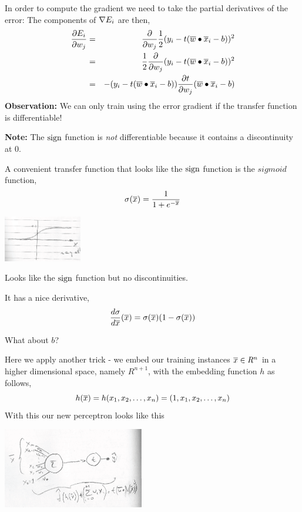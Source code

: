 \documentclass[a4paper,blends,pdf,colorBG,slideColor]{prosper}
\begin{document}
In order to compute the gradient we need to take the partial derivatives of the error:  The components of $\nabla E_i$ are then,
\begin{eqnarray*}
\frac{\partial E_i}{\partial w_j} &=& \frac{\partial}{\partial w_j} \frac{1}{2} (y_i - t(\overline{w}\bullet\overline{x}_i - b))^2\\
	&=& \frac{1}{2} \frac{\partial}{\partial w_j} (y_i - t(\overline{w}\bullet\overline{x}_i - b))^2\\
	&=& - (y_i - t(\overline{w}\bullet\overline{x}_i - b))\frac{\partial t}{\partial w_j} (\overline{w}\bullet\overline{x}_i - b)\\
\end{eqnarray*}
{\bf Observation:} We can only train using the error gradient if the transfer function is differentiable!

\vspace{.2in}

{\bf Note:} The $\sign$ function is {\em not} differentiable because it contains a discontinuity at 0.
\es


A convenient transfer function that looks like the $\sign$ function is the $sigmoid$ function,
\[
\sigma(\overline{x}) = \frac{1}{1+e^{-\overline{x}}}
\] 
\begin{center}
\includegraphics[height=20mm]{images/sigmoid.eps}
\end{center}

Looks like the $\sign$ function but no discontinuities.

\vspace{.2in}

It has a nice derivative,
\[
\frac{d\sigma}{d\overline{x}}(\overline{x}) =  \sigma(\overline{x})(1-\sigma(\overline{x}))
\]
\es


What about $b$?

\vspace{.2in}

Here we apply another trick - we embed our training instances $\overline{x} \in R^n$ in a higher dimensional space, namely $R^{n+1}$,
with the embedding function $h$ as follows,
\[
h(\overline{x}) = h(x_1,x_2,\ldots,x_n) = (1,x_1,x_2,\ldots,x_n)
\]
With this our new perceptron looks like this
\begin{center}
\includegraphics[height=35mm]{images/perceptron.eps}
\end{center}
\end{document}
